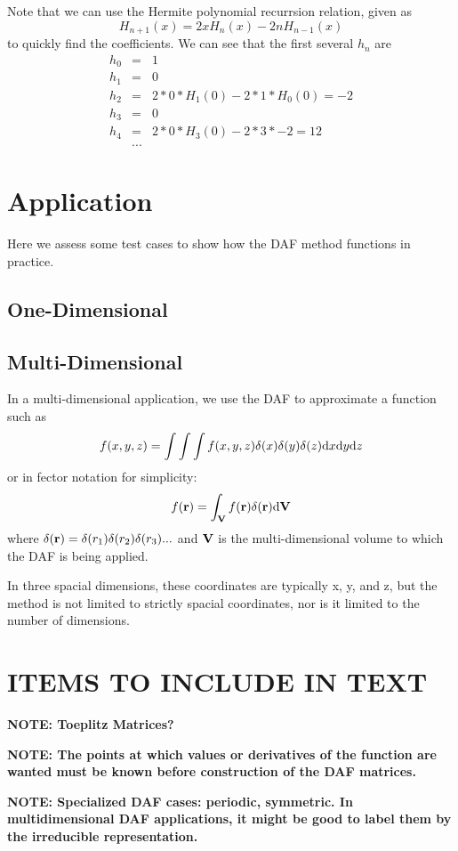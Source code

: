 \documentclass[preprint]{revtex4}
\begin{document}
Note that we can use the Hermite polynomial recurrsion relation, given as
\begin{equation}
\label{eqn_HermiteRecur}
H_{n+1}(x) = 2xH_n(x)-2nH_{n-1}(x)
\end{equation}
to quickly find the coefficients. We can see that the first several $h_n$  are
\begin{eqnarray}
h_0 & =&  1 \nonumber \\
h_1 &=& 0 \nonumber \\
h_2 &=& 2*0*H_1(0)-2*1*H_0(0) = -2 \nonumber \\
h_3 &=& 0 \nonumber \\
h_4 &=& 2*0*H_3(0) - 2*3*-2= 12 \nonumber \\
&...& \nonumber
\end{eqnarray}

\section{Application}
Here we assess some test cases to show how the DAF method functions in practice. 

\subsection{One-Dimensional}

\subsection{Multi-Dimensional}
In a multi-dimensional application, we use the DAF to approximate a function such as
\begin{equation}
f(x,y,z) = \int\int\int f(x,y,z)\delta(x)\delta(y)\delta(z) {\rm d}x {\rm d}y {\rm d}z
\end{equation}
or in fector notation for simplicity: 
\begin{equation}
f({\bf r}) = \int_{\bf V} f({\bf r})\delta({\bf r}){\rm d}{\bf V}
\end{equation}
where $\delta({\bf r}) = \delta(r_1)\delta(r_2)\delta(r_3)...$ and ${\bf V}$ is the
multi-dimensional volume to which the DAF is being applied. 

In three spacial dimensions, these coordinates are typically x, y, and z, but the method is
not limited to strictly spacial coordinates, nor is it limited to the number of
dimensions. 



\section{ITEMS TO INCLUDE IN TEXT}
{\bf NOTE: Toeplitz Matrices?}

{\bf NOTE: The points at which values or derivatives of the function are wanted must be known
before construction of the DAF matrices. }

{\bf NOTE: Specialized DAF cases: periodic, symmetric. In multidimensional DAF applications, 
it might be good to label them by the irreducible representation.}





\end{document}
